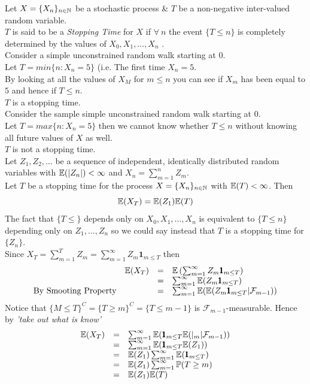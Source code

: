 \documentclass[11pt,a4paper]{article}
\begin{document}
Let $X=\{X_n\}_{n\in\mathbb{N}}$ be a stochastic process \& $T$ be a non-negative inter-valued random variable.\\
$T$ is said to be a \textit{Stopping Time} for $X$ if $\forall\ n$ the event $\{T\leq n\}$ is completely determined by the values of $X_0,X_1,\dots,X_n$ .\\

Consider a simple unconstrained random walk starting at 0.\\
Let $T=min\{n:X_n=5\}$ (i.e. The first time $X_n=5$.\\
By looking at all the values of $X_M$ for $m\leq n$ you can see if $X_m$ has been equal to $5$ and hence if $T\leq n$.\\
$T$ is a stopping time.\\

Consider the sample simple unconstrained random walk starting at 0.\\
Let $T=max\{n:X_n=5\}$ then we cannot know whether $T\leq n$ without knowing all future values of $X$ as well.\\
$T$ is not a stopping time.\\

Let $Z_1,Z_2,\dots$ be a sequence of independent, identically distributed random variables with $\mathbb{E}(|Z_n|)<\infty$ and $X_n=\sum_{m=1}^nZ_m$.\\
Let $T$ be a stopping time for the process $X=\{X_n\}_{n\in\mathbb{N}}$ with $\mathbb{E}(T)<\infty$. Then
$$\mathbb{E}(X_T)=\mathbb{E}(Z_1)\mathbb{E}(T)$$
\nb The fact that $\{T\leq\}$ depends only on $X_0,X_1,\dots,X_n$ is equivalent to $\{T\leq n\}$ depending only on $Z_1,\dots,Z_n$ so we could say instead that $T$ is a stopping time for $\{Z_n\}$.\\

Since $X_T=\sum_{m=1}^TZ_m=\sum_{m=1}^\infty Z_m\pmb{1}_{m\leq T}$ then
\[\begin{array}{rrcl}
&\expect(X_T)&=&\expect\left(\sum_{m=1}^\infty Z_m\pmb{1}_{m\leq T}\right)\\
&&=&\sum_{m=1}^\infty\expect(Z_m\pmb{1}_{m\leq T})\\
\mathrm{By\ Smooting\ Property}&&=&\sum_{m=1}^\infty\expect(\expect(Z_m\pmb{1}_{m\leq T}|\mathcal{F}_{m-1}))
\end{array}\]
Notice that $\{M\leq T\}^C=\{T\geq m\}^C=\{T\leq m-1\}$ is $\mathcal{F}_{m-1}$-measurable. Hence by \textit{'take out what is know'}\\
\[\begin{array}{rcl}
\mathbb{E}(X_T)&=&\sum_{m=1}^\infty\mathbb{E}(\pmb{1}_{m\leq T}\mathbb{E}(|_m|\mathcal{F}_{m-1}))\\
&=&\sum_{m=1}^\infty\mathbb{E}(\pmb{1}_{m\leq T}\mathbb{E}(Z_1))\\
&=&\mathbb{E}(Z_1)\sum_{m=1}^\infty\mathbb{E}(\pmb{1}_{m\leq T})\\
&=&\mathbb{E}(Z_1)\sum_{m=1}^\infty\mathbb{P}(T\geq m)\\
&=&\mathbb{E}(Z_1)\mathbb{E}(T)
\end{array}\]
\end{document}
